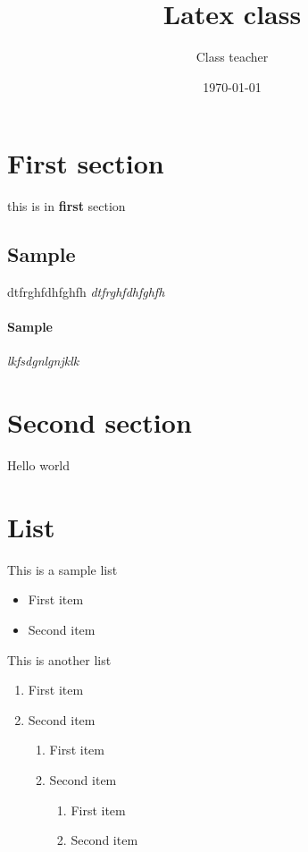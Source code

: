 \documentclass[14pt]{article}
\title{Latex class}
\author{Class teacher}
\date{\today}
\begin{document}
\maketitle

\tableofcontents

\section{First section}
\label{sec:1}
this is in \textbf{first} section
\subsection{Sample}
\label{subsec:1}


{\color{red} dtfrghfdhfghfh}
\emph{dtfrghfdhfghfh}


\pagebreak



\paragraph{Sample}
\textit{lkfsdgnlgnjklk}

\section{Second section}

Hello world

\section{List}
This is a sample list

\begin{itemize}
	\item First item
	\item Second item
\end{itemize}




This is another list
\begin{enumerate}
		\item First item
		\item Second item
		\begin{enumerate}
		\item First item
		\item Second item
			\begin{enumerate}
				\item First item
				\item Second item
				
			\end{enumerate}
		\end{enumerate}
\end{enumerate}
\end{document}
